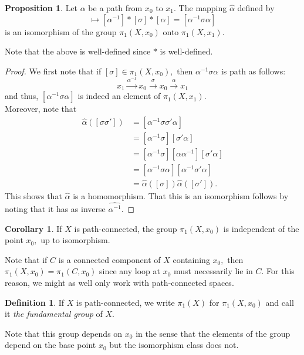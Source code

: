 \documentclass[12pt]{article}
\theoremstyle{definition}
\numberwithin{thm}{section}
\newtheorem{defn}[thm]{Definition}
\newtheorem{prop}[thm]{Proposition}
\newtheorem{cor}[thm]{Corollary}
\begin{document}
\begin{prop}
	Let $\alpha$ be a path from $x_0$ to $x_1.$ The mapping $\widehat{\alpha}$ defined by
	\begin{equation*} 
		[\sigma] \mapsto [\alpha^{-1}]*[\sigma]*[\alpha] = [\alpha^{-1}\sigma\alpha]
	\end{equation*}
	is an isomorphism of the group $\pi_1(X, x_0)$ onto $\pi_1(X, x_1).$
\end{prop}
Note that the above is well-defined since $*$ is well-defined.
\begin{proof} 
	We first note that if $[\sigma] \in \pi_1(X, x_0),$ then $\alpha^{-1}\sigma\alpha$ is path as follows:
	\begin{equation*} 
		x_1 \overset{\alpha^{-1}}{\longrightarrow} x_0 \overset{\sigma}{\longrightarrow} x_0 \overset{\alpha}{\longrightarrow} x_1
	\end{equation*}
	and thus, $[\alpha^{-1}\sigma\alpha]$ is indeed an element of $\pi_1(X, x_1).$\\
	Moreover, note that
	\begin{align*} 
		\widehat{\alpha}([\sigma\sigma']) &= [\alpha^{-1}\sigma\sigma'\alpha]\\
		&= [\alpha^{-1}\sigma][\sigma'\alpha]\\
		&= [\alpha^{-1}\sigma][\alpha\alpha^{-1}][\sigma'\alpha]\\
		&= [\alpha^{-1}\sigma\alpha][\alpha^{-1}\sigma'\alpha]\\
		&= \widehat{\alpha}([\sigma])\widehat{\alpha}([\sigma']).
	\end{align*}
	This shows that $\widehat{\alpha}$ is a homomorphism. That this is an isomorphism follows by noting that it has as inverse $\widehat{\alpha^{-1}}.$
\end{proof}
\begin{cor}
	If $X$ is path-connected, the group $\pi_1(X, x_0)$ is independent of the point $x_0,$ up to isomorphism.
\end{cor}
Note that if $C$ is a connected component of $X$ containing $x_0,$ then $\pi_1(X, x_0) = \pi_1(C, x_0)$ since any loop at $x_0$ must necessarily lie in $C.$ For this reason, we might as well only work with path-connected spaces.
\begin{defn}
	If $X$ is path-connected, we write $\pi_1(X)$ for $\pi_1(X, x_0)$ and call it \emph{the fundamental group} of $X.$
\end{defn}
Note that this group depends on $x_0$ in the sense that the elements of the group depend on the base point $x_0$ but the isomorphism class does not.\\
\end{document}
